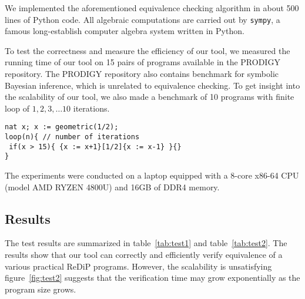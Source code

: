 \documentclass[a4paper]{article}
\begin{document}
We implemented the aforementioned equivalence checking algorithm in about 500 lines of Python code. All algebraic computations are carried out by \texttt{sympy}\cite{sympy}, a famous long-establish computer algebra system written in Python.\par
To test the correctness and measure the efficiency of our tool, we measured the running time of our tool on 15 pairs of programs available in the PRODIGY repository. The PRODIGY repository also contains benchmark for symbolic Bayesian inference, which is unrelated to equivalence checking. To get insight into the scalability of our tool, we also made a benchmark of 10 programs with finite loop of \(1,2,3,\ldots 10\) iterations.
\begin{verbatim}
nat x; x := geometric(1/2);
loop(n){ // number of iterations
 if(x > 15){ {x := x+1}[1/2]{x := x-1} }{}
}
\end{verbatim}
The experiments were conducted on a laptop equipped with a 8-core x86-64 CPU (model AMD RYZEN 4800U) and 16GB of DDR4 memory.

\subsection{Results}

The test results are summarized in table~\ref{tab:test1} and table~\ref{tab:test2}.
The results show that our tool can correctly and efficiently verify equivalence of a various practical ReDiP programs.
However, the scalability is unsatisfying figure~\ref{fig:test2} suggests that the verification time may grow exponentially as the program size grows.
\end{document}
